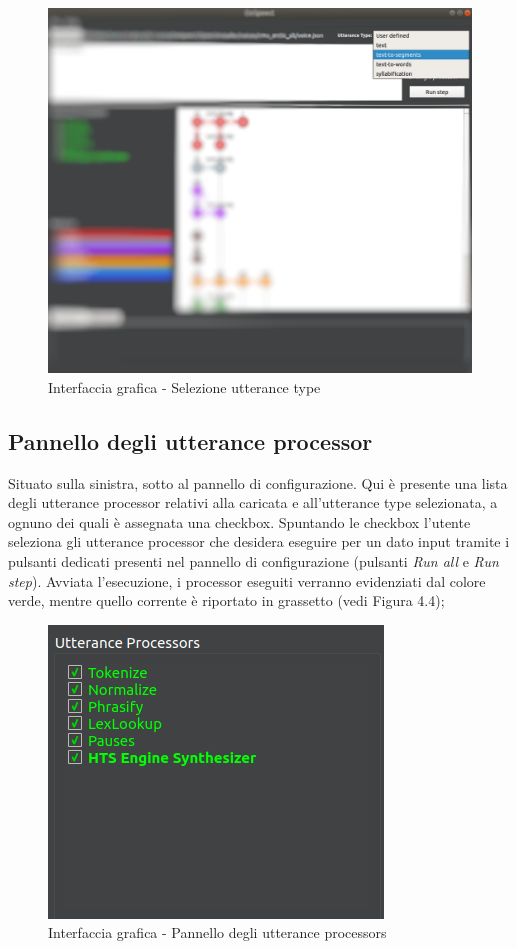\documentclass[openany,12pt,a4paper]{report}
\begin{document}
	 	\begin{figure}[H]
	 		
	 		\centering
	 		
	 		\includegraphics[width=\textwidth]{./img/utterance-type}
	 		
	 		\caption{Interfaccia grafica - Selezione utterance type}
	 		
	 	\end{figure}
 	\newpage
 	
 	\subsection{Pannello degli utterance processor}
 	Situato sulla sinistra, sotto al pannello di configurazione. Qui è presente una lista degli utterance processor relativi alla  caricata e all'utterance type selezionata, a ognuno dei quali è assegnata una checkbox. Spuntando le checkbox l'utente seleziona gli utterance processor che desidera eseguire per un dato input tramite i pulsanti dedicati presenti nel pannello di configurazione (pulsanti \textit{Run all} e \textit{Run step}). Avviata l'esecuzione, i processor eseguiti verranno evidenziati dal colore verde, mentre quello corrente è riportato in grassetto (vedi Figura 4.4);
 		\begin{figure}[H]
 			
 			\centering
 			
 				\includegraphics[width=.4\textwidth]{./img/utterance-processors}
 			
 			\caption{Interfaccia grafica - Pannello degli utterance processors}
 			
 		\end{figure}
 		
\end{document}

